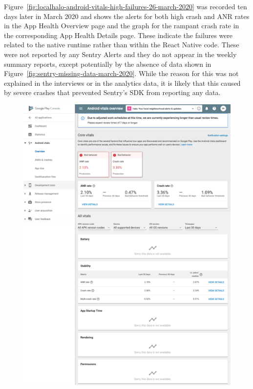 Figure~\ref{fig:localhalo-android-vitals-high-failures-26-march-2020} was recorded ten days later in  March 2020 and shows the alerts for both high crash and ANR rates in the App Health Overview page and the graph for the rampant crash rate in the corresponding App Health Details page. These indicate the failures were related to the native runtime rather than within the React Native code. These were not reported by any Sentry Alerts and they do not appear in the weekly summary reports, except potentially by the absence of data shown in Figure~\ref{fig:sentry-missing-data-march-2020}. While the reason for this was not explained in the interviews or in the analytics data, it is likely that this caused by severe crashes that prevented Sentry's SDK from reporting any data.

\begin{figure}[htbp!]
\centering
\begin{minipage}{.45\textwidth}
  \centering
  \includegraphics[width=\textwidth]{images/localhalo/apphealthoverviewplace_5550596_high_errors.png}

\end{minipage}
\end{figure}
